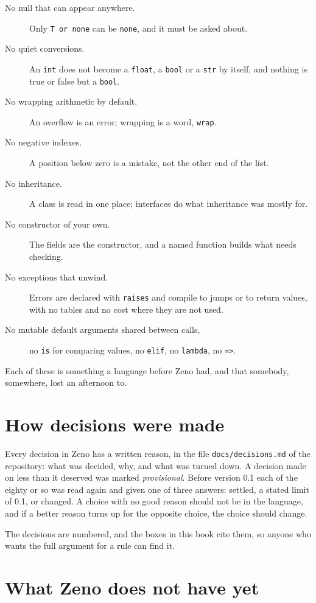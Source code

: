 \begin{description}
\item[No null that can appear anywhere.] Only \verb|T or none| can be
  \verb|none|, and it must be asked about.
\item[No quiet conversions.] An \verb|int| does not become a
  \verb|float|, a \verb|bool| or a \verb|str| by itself, and nothing is
  true or false but a \verb|bool|.
\item[No wrapping arithmetic by default.] An overflow is an error;
  wrapping is a word, \verb|wrap|.
\item[No negative indexes.] A position below zero is a mistake, not the
  other end of the list.
\item[No inheritance.] A class is read in one place; interfaces do
  what inheritance was mostly for.
\item[No constructor of your own.] The fields are the constructor, and
  a named function builds what needs checking.
\item[No exceptions that unwind.] Errors are declared with
  \verb|raises| and compile to jumps or to return values, with no
  tables and no cost where they are not used.
\item[No mutable default arguments shared between calls,] no
  \verb|is| for comparing values, no \verb|elif|, no \verb|lambda|, no
  \verb|=>|.
\end{description}

Each of these is something a language before Zeno had, and that
somebody, somewhere, lost an afternoon to.

\section{How decisions were made}

Every decision in Zeno has a written reason, in the file
\verb|docs/decisions.md| of the repository: what was decided, why, and
what was turned down. A decision made on less than it deserved was
marked \emph{provisional}. Before version 0.1 each of the eighty or so
was read again and given one of three answers: settled, a stated limit
of 0.1, or changed. A choice with no good reason should not be in the
language, and if a better reason turns up for the opposite choice, the
choice should change.

The decisions are numbered, and the boxes in this book cite them, so
anyone who wants the full argument for a rule can find it.

\section{What Zeno does not have yet}

